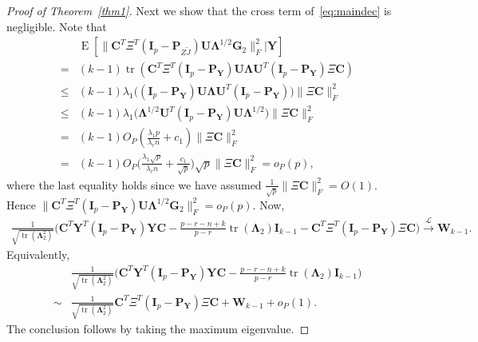 \documentclass[12pt]{article} %
\DeclareMathOperator{\mytr}{tr}
\DeclareMathOperator{\myE}{E}
\newcommand{\bP}{\mathbf{P}}
\newcommand{\bY}{\mathbf{Y}}
\newcommand{\bG}{\mathbf{G}}
\newcommand{\bC}{\mathbf{C}}
\newcommand{\bI}{\mathbf{I}}
\newcommand{\bU}{\mathbf{U}}
\newcommand{\bW}{\mathbf{W}}
\newcommand{\bfsym}[1]{\ensuremath{\boldsymbol{#1}}}
\def\bLambda {\bfsym {\Lambda}}
\theoremstyle{definition}
\begin{document}
\begin{proof}[\textrm{Proof of Theorem~\ref{thm1}}]
Next we show that the cross term of~\eqref{eq:maindec} is negligible. Note that
$$
\begin{aligned}
    &\myE [\|\bC^T \Xi^T (\bI_p -\bP_{Z\tilde{J}})\bU\bLambda^{1/2}\bG_2\|_F^2|\bY]\\
    = &
    (k-1)\mytr(\bC^T \Xi^T (\bI_p -\bP_{\bY})\bU\bLambda \bU^T (\bI_p -\bP_{\bY})\Xi \bC)\\
    \leq &
    (k-1)\lambda_1\big((\bI_p -\bP_{\bY})\bU\bLambda \bU^T (\bI_p -\bP_{\bY})\big)\|\Xi \bC\|^2_F\\
    \leq &
    (k-1)\lambda_1\big(\bLambda^{1/2} \bU^T (\bI_p -\bP_{\bY})\bU \bLambda^{1/2}\big)\|\Xi \bC\|^2_F\\
    = &
    (k-1) O_P(\frac{\lambda_1 p}{\lambda_r n}+c_1)  \|\Xi \bC\|^2_F\\
    = &
    (k-1) O_P\big(\frac{\lambda_1 \sqrt{p}}{\lambda_r n}+\frac{c_1}{\sqrt{p}}\big) \sqrt{p}  \|\Xi \bC\|^2_F=o_P(p),
\end{aligned}
$$
where the last equality holds since we have assumed $\frac{1}{\sqrt{p}}\|\Xi \bC\|_F^2=O(1)$.
Hence $\|\bC^T \Xi^T (\bI_p -\bP_{\bY})\bU\bLambda^{1/2}\bG_2\|_F^2=o_P(p)$. Now,
$$
\begin{aligned}
\frac{1}{\sqrt{\mytr(\bLambda_2^2)}}
    \big( \bC^T\bY^T(\bI_p-\bP_{\bY}) \bY \bC
    -\tfrac{p-r-n+k}{p-r}\mytr(\bLambda_2)\bI_{k-1} -\bC^T \Xi^T (\bI_p-\bP_{\bY})\Xi \bC\big)
\xrightarrow{\mathcal{L}} \bW_{k-1}.
\end{aligned}
$$
    Equivalently,
    $$
    \begin{aligned}
        &\frac{1}{\sqrt{\mytr(\bLambda_2^2)}} {\Big(\bC^T\bY^T(\bI_p-\bP_{\bY}) \bY \bC- \frac{p-r-n+k}{p-r}\mytr(\bLambda_2)\bI_{k-1}}\Big)\\
        \sim&
\frac{1}{\sqrt{\mytr(\bLambda_2^2)}} \bC^T \Xi^T (\bI_p-\bP_{\bY})\Xi \bC
        +\bW_{k-1}+o_P(1).
    \end{aligned}
    $$
    The conclusion follows by taking the maximum eigenvalue.
\end{proof}
\end{document}
